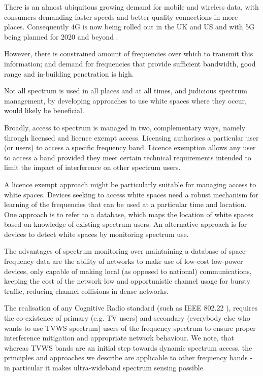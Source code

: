 There is an almost ubiquitous growing demand for mobile and wireless data, with consumers demanding faster speeds and better quality connections in more places. Consequently 4G is now being rolled out in the UK and US and with 5G being planned for 2020 and beyond \cite{Dahlman2014}.  

However, there is constrained amount of frequencies over which to transmit this information; and demand for frequencies that provide sufficient bandwidth, good range and in-building penetration is high.

Not all spectrum is used in all places and at all times, and judicious spectrum management, by developing approaches to use white spaces where they occur, would likely be beneficial.

Broadly, access to spectrum is managed in two, complementary ways, namely through licensed and licence exempt access. Licensing authorises a particular user (or users) to access a specific frequency band. Licence exemption allows any user to access a band provided they meet certain technical requirements intended to limit the impact of interference on other spectrum users.

A licence exempt approach might be particularly suitable for managing access to white spaces. Devices seeking to access white spaces need a robust mechanism for learning of the frequencies that can be used at a particular time and location. One approach is to refer to a database, which maps the location of white spaces based on knowledge of existing spectrum users. An alternative approach is for devices to detect white spaces by monitoring spectrum use. 

The advantages of spectrum monitoring \cite{akan2009cognitive} over maintaining a database of space-frequency data are the ability of networks to make use of low-cost low-power devices, only capable of making local (as opposed to national) communications, keeping the cost of the network low and  opportunistic channel usage for bursty traffic, reducing channel collisions in dense networks.

The realisation of any Cognitive Radio standard (such as IEEE 802.22 \cite{stevenson2009ieee}), requires the co-existence of primary (e.g. TV users) and secondary (everybody else who wants to use TVWS spectrum) users of the frequency spectrum to ensure proper interference mitigation and appropriate network behaviour. We note, that whereas TVWS bands are an initial step towards dynamic spectrum access, the principles and approaches we describe are applicable to other frequency bands - in particular it makes ultra-wideband spectrum sensing possible.


